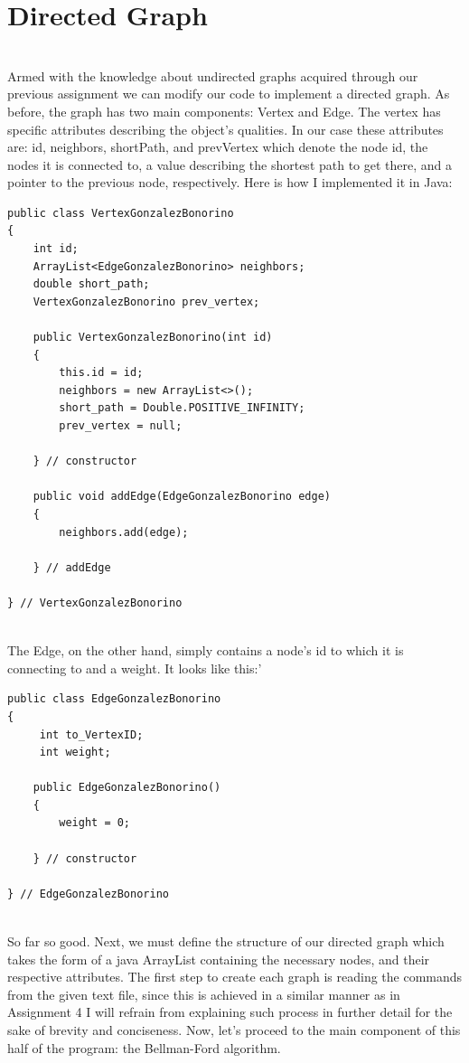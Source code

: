 \documentclass[letterpaper, 10pt]{article}
\begin{document}
\section{Directed Graph}
\\
Armed with the knowledge about undirected graphs acquired through our previous assignment we can modify our code to implement a directed graph. As before, the graph has two main components: Vertex and Edge. The vertex has specific attributes describing the object's qualities. In our case these attributes are: id, neighbors, shortPath, and prevVertex which denote the node id, the nodes it is connected to, a value describing the shortest path to get there, and a pointer to the previous node, respectively. Here is how I implemented it in Java:
\begin{lstlisting}
public class VertexGonzalezBonorino 
{
	int id;
    ArrayList<EdgeGonzalezBonorino> neighbors;
    double short_path;
    VertexGonzalezBonorino prev_vertex;

    public VertexGonzalezBonorino(int id)
    {
        this.id = id;
        neighbors = new ArrayList<>();
        short_path = Double.POSITIVE_INFINITY;
        prev_vertex = null;

    } // constructor

    public void addEdge(EdgeGonzalezBonorino edge)
    {
        neighbors.add(edge);
        
    } // addEdge
    
} // VertexGonzalezBonorino
\end{lstlisting}
\\
The Edge, on the other hand, simply contains a node's id to which it is connecting to and a weight. It looks like this:'
\begin{lstlisting}
public class EdgeGonzalezBonorino 
{
	 int to_VertexID;
	 int weight;

    public EdgeGonzalezBonorino()
    {
        weight = 0;
        
    } // constructor
    
} // EdgeGonzalezBonorino
\end{lstlisting}
\\
So far so good. Next, we must define the structure of our directed graph which takes the form of a java ArrayList containing the necessary nodes, and their respective attributes. The first step to create each graph is reading the commands from the given text file, since this is achieved in a similar manner as in Assignment 4 I will refrain from explaining such process in further detail for the sake of brevity and conciseness. Now, let's proceed to the main component of this half of the program: the Bellman-Ford algorithm.
\end{document}
